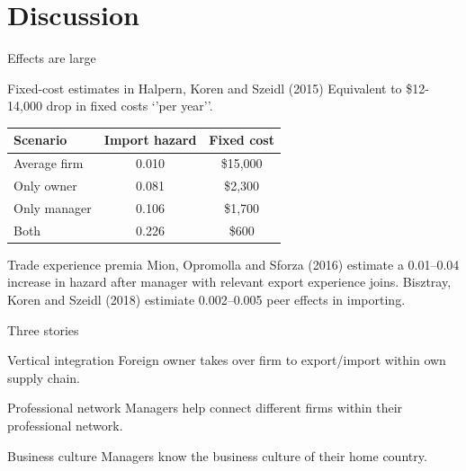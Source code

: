 \documentclass[
  ignorenonframetext,
  aspectratio=43,
]{beamer}
\begin{document}
\hypertarget{discussion}{%
\section{Discussion}\label{discussion}}

\begin{frame}{Effects are large}
\protect\hypertarget{effects-are-large}{}
\begin{block}{Fixed-cost estimates in Halpern, Koren and Szeidl (2015)}
\protect\hypertarget{fixed-cost-estimates-in-halpern-koren-and-szeidl-2015}{}
Equivalent to \$12-14,000 drop in fixed costs `'per year''.

\begin{tabular}{l|cc}
Scenario & Import hazard & Fixed cost \\
\hline
Average firm & 0.010 & \$15,000\\
Only owner & 0.081 & \$2,300\\
Only manager & 0.106 & \$1,700\\
Both & 0.226 & \$600
\end{tabular}
\end{block}

\begin{block}{Trade experience premia}
\protect\hypertarget{trade-experience-premia}{}
Mion, Opromolla and Sforza (2016) estimate a 0.01--0.04 increase in
hazard after manager with relevant export experience joins. Bisztray,
Koren and Szeidl (2018) estimiate 0.002--0.005 peer effects in
importing.
\end{block}
\end{frame}

\begin{frame}{Three stories}
\protect\hypertarget{three-stories}{}
\begin{block}{Vertical integration}
\protect\hypertarget{vertical-integration}{}
Foreign owner takes over firm to export/import within own supply chain.
\end{block}

\begin{block}{Professional network}
\protect\hypertarget{professional-network}{}
Managers help connect different firms within their professional network.
\end{block}

\begin{block}{Business culture}
\protect\hypertarget{business-culture}{}
Managers know the business culture of their home country.
\end{block}
\end{frame}
\end{document}
